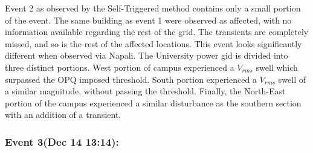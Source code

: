 Event 2 as observed by the Self-Triggered method contains only a small portion of the event.
The same building as event 1 were observed as affected, with no information available regarding the rest of the grid.
The transients are completely missed, and so is the rest of the affected locations.
This event looks significantly different when observed via Napali.
The University power gid is divided into three distinct portions.
West portion of campus experienced a $V_{rms}$ swell which surpassed the OPQ imposed threshold.
South portion experienced a $V_{rms}$ swell of a similar magnitude, without passing the threshold.
Finally, the North-East portion of the campus experienced a similar disturbance as the southern section with an addition of a transient.

\subsubsection{Event 3(Dec 14 13:14):}


